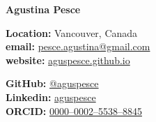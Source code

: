 \documentclass[5pt, legal]{article}
\makeatletter
\newcommand{\firstname}{Agustina}
\newcommand{\familyname}{Pesce}
\newcommand{\email}{pesce.agustina@gmail.com}
\newcommand{\website}{aguspesce.github.io}
\newcommand{\github}{aguspesce}
\newcommand{\linkedin}{aguspesce}
\newcommand{\orcid}{0000--0002--5538--8845}
\newcommand{\fullname}{\firstname{} \familyname}
\newcommand{\maintitle}[1]{
    \begin{center}
        \textbf{\Huge #1}
    \end{center}
}
\newcommand{\subtitle}[1]{
    \begin{center}
        {\large #1}
    \end{center}
}
\newcommand{\affiliation}[1]{
    \begin{center}
        {#1}
    \end{center}
}
\newcommand{\entriespad}{0.75em}
\newcommand{\MAIL}[1]{\href{mailto:#1}{#1}}
\newcommand{\GITHUB}[1]{\href{https://github.com/#1}{@#1}}
\newcommand{\ORCID}[1]{\href{https://orcid.org/#1}{#1}}
\newcommand{\WEBSITE}[1]{\href{https://#1}{#1}}
\newcommand{\LINKEDIN}[1]{\href{https://linkedin.com/in/#1}{#1}}
\makeatother
\begin{document}
\maintitle{\fullname}
\affiliation{}
\vspace{\entriespad}

\begin{minipage}[t]{0.60\linewidth}
    \begin{flushleft}
        \textbf{Location:} Vancouver, Canada
        \\
        \textbf{email:} \MAIL{\email}
        \\
        \textbf{website:} \WEBSITE{\website}
        \\
    \end{flushleft}
\end{minipage}
\hfill
\begin{minipage}[t]{0.40\linewidth}
    \begin{flushright}
        \textbf{GitHub:} \GITHUB{\github}
        \\
        \textbf{Linkedin:} \LINKEDIN{\linkedin}
        \\
        \textbf{ORCID:} \ORCID{\orcid}
    \end{flushright}
\end{minipage}

\vspace{\entriespad}

\vspace{\entriespad}
\end{document}
